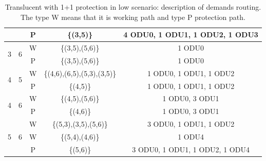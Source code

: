 \begin{table}[h!]
\begin{tabular}{||c|c|c|c|c||}
  & &P& \{(3,5)\} & 4 ODU0, 1 ODU1, 1 ODU2, 1 ODU3 \\ \hline
 \multirow{2}{*}{3} & \multirow{2}{*}{6}&W& \{(3,5),(5,6)\} & 1 ODU0 \\
  & &P& \{(3,5),(5,6)\} & 1 ODU0 \\ \hline
 \multirow{2}{*}{4} & \multirow{2}{*}{5}&W& \{(4,6),(6,5),(5,3),(3,5)\} & 1 ODU0, 1 ODU1, 1 ODU2 \\
  & &P& \{(4,5)\} & 1 ODU0, 1 ODU1, 1 ODU2 \\ \hline
 \multirow{2}{*}{4} & \multirow{2}{*}{6}&W& \{(4,5),(5,6)\} & 1 ODU0, 3 ODU1\\
  & &P& \{(4,6)\} & 1 ODU0, 3 ODU1\\ \hline
 \multirow{3}{*}{5} & \multirow{3}{*}{6}&W&\{(5,3),(3,5),(5,6)\}& 3 ODU0, 1 ODU1, 1 ODU2 \\
  & &W& \{(5,4),(4,6)\} & 1 ODU4 \\
  & &P& \{(5,6)\}& 3 ODU0, 1 ODU1, 1 ODU2, 1 ODU4 \\ \hline
\end{tabular}
\caption{Translucent with 1+1 protection in low scenario: description of demands routing. The type W means that it is working path and type P protection path.}
\label{path_transluc_protec_ref_low}
\end{table}

